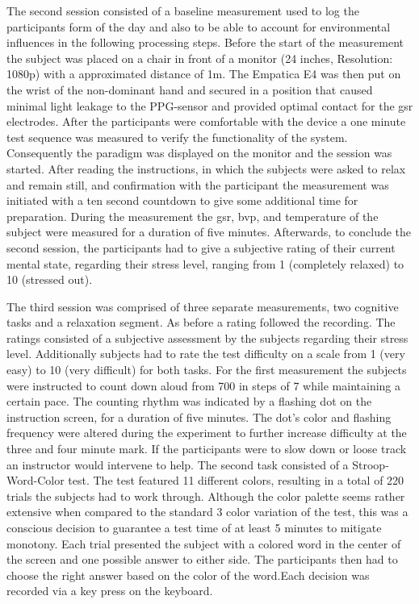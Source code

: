 The second session consisted of a baseline measurement used to log the participants form of the day and also to be able to account for environmental influences in the following processing steps. Before the start of the measurement the subject was placed on a chair in front of a monitor (24 inches, Resolution: 1080p) with a approximated distance of 1m. The Empatica E4 was then put on the wrist of the non-dominant hand and secured in a position that caused minimal light leakage to the PPG-sensor and provided optimal contact for the \gls{gsr} electrodes. After the participants were comfortable with the device a one minute test sequence was measured to verify the functionality of the system.
Consequently the paradigm was displayed on the monitor and the session was started. After reading the instructions, in which the subjects were asked to relax and remain still, and confirmation with the participant the measurement was initiated with a ten second countdown to give some additional time for preparation.
During the measurement the \gls{gsr}, \gls{bvp}, and temperature of the subject were measured for a duration of five minutes.
Afterwards, to conclude the second session, the participants had to give a subjective rating of their current mental state, regarding their stress level, ranging from 1 (completely relaxed) to 10 (stressed out).

The third session was comprised of three separate measurements, two cognitive tasks and a relaxation segment. As before a rating followed the recording. The ratings consisted of a subjective assessment by the subjects regarding their stress level. Additionally subjects had to rate the test difficulty on a scale from 1 (very easy) to 10 (very difficult) for both tasks. 
For the first measurement the subjects were instructed to count down aloud from 700 in steps of 7 while maintaining a certain pace. The counting rhythm was indicated by a flashing dot on the instruction screen, for a duration of five minutes. The dot's color and flashing frequency were altered during the experiment to further increase difficulty at the three and four minute mark. If the participants were to slow down or loose track an instructor would intervene to help.
The second task consisted of a Stroop-Word-Color test. The test featured 11 different colors, resulting in a total of 220 trials the subjects had to work through. Although the color palette seems rather extensive when compared to the standard 3 color variation of the test, this was a conscious decision to guarantee a test time of at least 5 minutes to mitigate monotony. Each trial presented the subject with a colored word in the center of the screen and one possible answer to either side. The participants then had to choose the right answer based on the color of the word.Each decision was recorded via a key press on the keyboard. 

